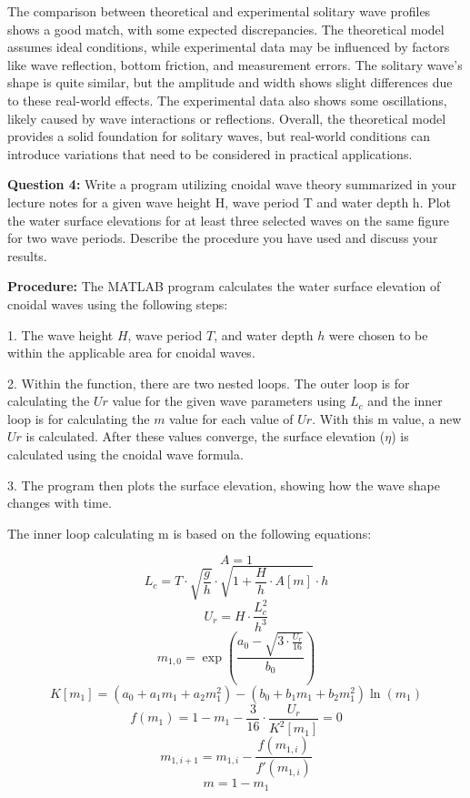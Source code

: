 \documentclass[a4paper]{article}
\begin{document}
The comparison between theoretical and experimental solitary wave profiles shows a good match, with some expected discrepancies. The theoretical model assumes ideal conditions, while experimental data may be influenced by factors like wave reflection, bottom friction, and measurement errors. The solitary wave's shape is quite similar, but the amplitude and width shows slight differences due to these real-world effects. The experimental data also shows some oscillations, likely caused by wave interactions or reflections. Overall, the theoretical model provides a solid foundation for solitary waves, but real-world conditions can introduce variations that need to be considered in practical applications.
\vspace{0.5cm}

\textbf{Question 4:} Write a program utilizing cnoidal wave theory summarized in your lecture notes for a given wave height H, wave period T and water depth h. Plot the water surface elevations for at least three selected waves on the same figure for two wave periods. Describe the procedure you have used and discuss your results.

\textbf{Procedure:} The MATLAB program calculates the water surface elevation of cnoidal waves using the following steps:

1. The wave height \(H\), wave period \(T\), and water depth \(h\) were chosen to be within the applicable area for cnoidal waves.

2. Within the function, there are two nested loops. The outer loop is for calculating the \(Ur\) value for the given wave parameters using \(L_c\) and the inner loop is for calculating the \(m\) value for each value of \(Ur\). With this m value, a new \(Ur\) is calculated. After these values converge, the surface elevation ($\eta$) is calculated using the cnoidal wave formula.

3. The program then plots the surface elevation, showing how the wave shape changes with time.
\vspace{0.3cm}

The inner loop calculating m is based on the following equations:

\[A = 1 \]
\[ L_c = T \cdot \sqrt{\frac{g}{h}} \cdot \sqrt{1 + \frac{H}{h} \cdot A[m]} \cdot h \]
\[U_r = H \cdot \frac{L_c^2}{h^3} \]     
\[m_{1,0} = \exp\left(\frac{a_0 - \sqrt{3 \cdot \frac{U_r}{16}}}{b_0}\right)\]
\[K[m_1] = \left(a_0 + a_1 m_1 + a_2 m_1^2\right) - \left(b_0 + b_1 m_1 + b_2 m_1^2\right) \ln(m_1)\]
\[f(m_1) = 1 - m_1 - \frac{3}{16} \cdot \frac{U_r}{K^2[m_1]} = 0\]
\[m_{1,i+1} = m_{1,i} - \frac{f(m_{1,i})}{f'(m_{1,i})}\]
\[m = 1 - m_1\]
\vspace{0.3cm}
\end{document}
